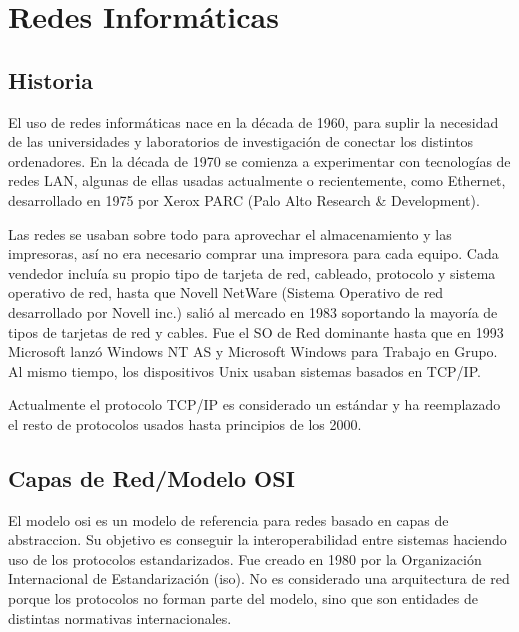 \documentclass[a4paper, 11pt]{report} %
\begin{document}
\chapter{Redes Informáticas}
\section*{Historia}
El uso de redes informáticas nace en la década de 1960, para suplir la necesidad de las universidades y laboratorios de investigación de conectar los distintos ordenadores. En la década de 1970 se comienza a experimentar con tecnologías de redes LAN, algunas de ellas usadas actualmente o recientemente, como Ethernet, desarrollado en 1975 por Xerox PARC (Palo Alto Research \& Development). 

Las redes se usaban sobre todo para aprovechar el almacenamiento y las impresoras, así no era necesario comprar una impresora para cada equipo. Cada vendedor incluía su propio tipo de tarjeta de red, cableado, protocolo y sistema operativo de red, hasta que Novell NetWare (Sistema Operativo de red desarrollado por Novell inc.) salió al mercado en 1983 soportando la mayoría de tipos de tarjetas de red y cables. Fue el SO de Red dominante hasta que en 1993 Microsoft lanzó Windows NT AS y Microsoft Windows para Trabajo en Grupo. Al mismo tiempo, los dispositivos Unix usaban sistemas basados en TCP/IP.

Actualmente el protocolo TCP/IP es considerado un estándar y ha reemplazado el resto de protocolos usados hasta principios de los 2000.

\newpage

\section{Capas de Red/Modelo OSI}
El modelo \acrshort{osi} es un modelo de referencia para redes basado en \gls{capas de abstraccion}.
Su objetivo es conseguir la interoperabilidad entre sistemas haciendo uso de los protocolos estandarizados. Fue creado en 1980 por la Organización Internacional de Estandarización (\acrshort{iso}). No es considerado una arquitectura de red porque los protocolos no forman parte del modelo, sino que son entidades de distintas normativas internacionales.
\vspace*{20pt}
\end{document}
